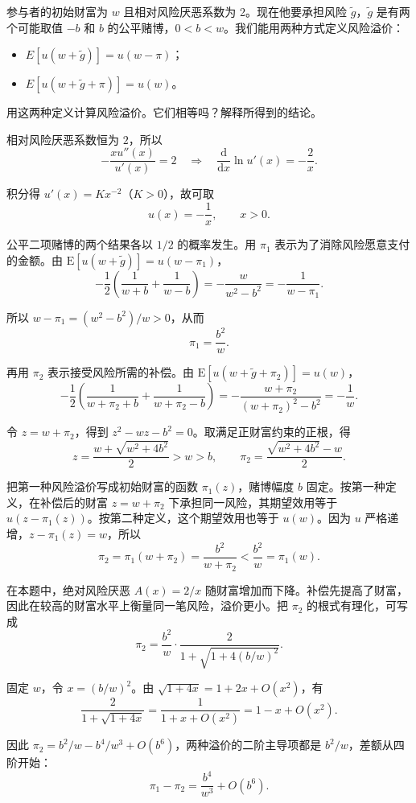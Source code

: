 \begin{problem}
 参与者的初始财富为 $w$ 且相对风险厌恶系数为 2。现在他要承担风险 $\tilde{g}$，$\tilde{g}$ 是有两个可能取值 $-b$ 和 $b$ 的公平赌博，$0<b<w$。我们能用两种方式定义风险溢价：
\begin{itemize}
    \item $E[u(w+\tilde{g})]=u(w-\pi)$；
    \item $E[u(w+\tilde{g}+\pi)]=u(w)$。
\end{itemize}
用这两种定义计算风险溢价。它们相等吗？解释所得到的结论。
\end{problem}
\begin{solution}[blank-type=manual,blank-vsep=8\baselineskip]
相对风险厌恶系数恒为 $2$，所以
\[
 -\frac{x u''(x)}{u'(x)}=2
 \quad\Longrightarrow\quad
 \frac{\mathrm d}{\mathrm dx}\ln u'(x)=-\frac2x.
\]

积分得 $u'(x)=Kx^{-2}$（$K>0$），故可取
\[
 u(x)=-\frac1x,\qquad x>0.
\]

公平二项赌博的两个结果各以 $1/2$ 的概率发生。用 $\pi_1$ 表示为了消除风险愿意支付的金额。由 $\mathrm E[u(w+\tilde g)]=u(w-\pi_1)$，
\[
 -\frac12\left(\frac1{w+b}+\frac1{w-b}\right)
 =-\frac{w}{w^2-b^2}=-\frac1{w-\pi_1}.
\]

所以 $w-\pi_1=(w^2-b^2)/w>0$，从而
\[
  \pi_1=\frac{b^2}{w}.
\]

再用 $\pi_2$ 表示接受风险所需的补偿。由 $\mathrm E[u(w+\tilde g+\pi_2)]=u(w)$，
\[
 -\frac12\left(\frac1{w+\pi_2+b}+\frac1{w+\pi_2-b}\right)
 =-\frac{w+\pi_2}{(w+\pi_2)^2-b^2}=-\frac1w.
\]

令 $z=w+\pi_2$，得到 $z^2-wz-b^2=0$。取满足正财富约束的正根，得
\[
 z=\frac{w+\sqrt{w^2+4b^2}}2>w>b,
 \qquad
 \pi_2=\frac{\sqrt{w^2+4b^2}-w}{2}.
\]

把第一种风险溢价写成初始财富的函数 $\pi_1(z)$，赌博幅度 $b$ 固定。按第一种定义，在补偿后的财富 $z=w+\pi_2$ 下承担同一风险，其期望效用等于 $u(z-\pi_1(z))$。按第二种定义，这个期望效用也等于 $u(w)$。因为 $u$ 严格递增，$z-\pi_1(z)=w$，所以
\[
 \pi_2=\pi_1(w+\pi_2)=\frac{b^2}{w+\pi_2}<\frac{b^2}{w}=\pi_1(w).
\]

在本题中，绝对风险厌恶 $A(x)=2/x$ 随财富增加而下降。补偿先提高了财富，因此在较高的财富水平上衡量同一笔风险，溢价更小。把 $\pi_2$ 的根式有理化，可写成
\[
 \pi_2=\frac{b^2}{w}\cdot\frac{2}{1+\sqrt{1+4(b/w)^2}}.
\]

固定 $w$，令 $x=(b/w)^2$。由 $\sqrt{1+4x}=1+2x+O(x^2)$，有
\[
 \frac{2}{1+\sqrt{1+4x}}=\frac{1}{1+x+O(x^2)}
 =1-x+O(x^2).
\]

因此 $\pi_2=b^2/w-b^4/w^3+O(b^6)$，两种溢价的二阶主导项都是 $b^2/w$，差额从四阶开始：
\[
 \pi_1-\pi_2=\frac{b^4}{w^3}+O(b^6).
\]

\end{solution}

